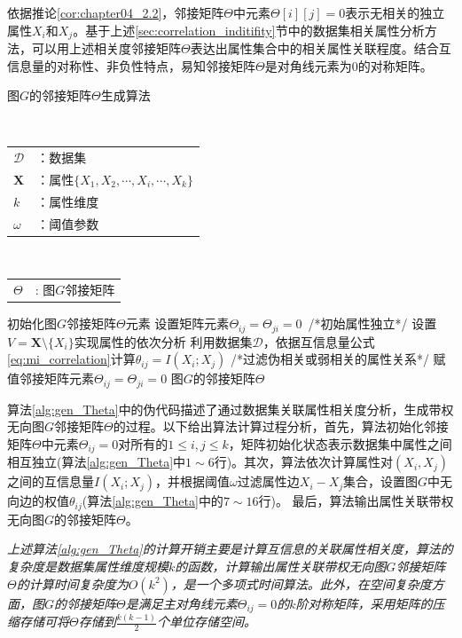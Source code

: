 依据推论\ref{cor:chapter04_2.2}，邻接矩阵$\Theta$中元素$\Theta[i][j]=0$表示无相关的独立属性$X_i$和$X_j$。基于上述\ref{sec:correlation_inditifity}节中的数据集相关属性分析方法，可以用上述相关度邻接矩阵$\Theta$表达出属性集合中的相关属性关联程度。结合互信息量的对称性、非负性特点\cite{shannon1948a}，易知邻接矩阵$\Theta$是对角线元素为$0$的对称矩阵。


\begin{algorithm}[htb]
 \small
\caption{ 图$G$的邻接矩阵$\Theta$生成算法}
\label{alg:gen_Theta}
\begin{algorithmic}[1]
\REQUIRE ~~\\
	\begin{tabular}[t]{p{1mm}l}
	 $\mathcal{D}$&：数据集\\
	 $\bm{X}$&：属性$\{X_1,X_2,\cdots,X_i,\cdots,X_k\}$\\
	 $k$&：属性维度\\
	 $\omega$&：阈值参数
	\end{tabular}
	\ENSURE ~~\\
	\begin{tabular}[t]{p{1mm}l}
	$\Theta$&: 图$G$邻接矩阵
	\end{tabular}
\STATE 初始化图$G$邻接矩阵$\Theta$元素
\STATE 设置矩阵元素$\Theta_{ij}=\Theta_{ji}=0$~/*初始属性独立*/
\ENDFOR
\ENDFOR
{}
\STATE 设置$V=\bm{X}\setminus\{X_i\}$实现属性的依次分析
\STATE 利用数据集$\mathcal{D}$，依据互信息量公式\ref{eq:mi_correlation}计算$\theta_{ij}=I(X_i;X_j)$
\STATE /*过滤伪相关或弱相关的属性关系*/
\STATE 赋值邻接矩阵元素$\Theta_{ij}=\Theta_{ji}=0$
\ENDIF
\ENDFOR
\ENDFOR
\RETURN 图$G$的邻接矩阵$\Theta$
\end{algorithmic}
\end{algorithm}


算法\ref{alg:gen_Theta}中的伪代码描述了通过数据集关联属性相关度分析，生成带权无向图$G$邻接矩阵$\Theta$的过程。以下给出算法计算过程分析，首先，算法初始化邻接矩阵$\Theta$中元素$\Theta_{ij}=0$对所有的$ 1\leq i,j \leq k$，矩阵初始化状态表示数据集中属性之间相互独立(算法\ref{alg:gen_Theta}中$1 \sim 6$行)。其次，算法依次计算属性对$(X_i,X_j)$之间的互信息量$I(X_i;X_j)$，并根据阈值$\omega$过滤属性边$X_i-X_j$集合，设置图$G$中无向边的权值$\theta_{ij}$(算法\ref{alg:gen_Theta}中的$7 \sim 16$行)。 最后，算法输出属性关联带权无向图$G$的邻接矩阵$\Theta$。

\begin{remark}
{\em 上述算法\textup{\ref{alg:gen_Theta}}的计算开销主要是计算互信息的关联属性相关度，算法的复杂度是数据集属性维度规模$k$的函数，计算输出属性关联带权无向图$G$邻接矩阵$\Theta$的计算时间复杂度为$O(k^2)$，是一个多项式时间算法。此外，在空间复杂度方面，图$G$的邻接矩阵$\Theta$是满足主对角线元素$\Theta_{ij}=0$的$k$阶对称矩阵，采用矩阵的压缩存储可将$\Theta$存储到$\frac{k(k-1)}{2}$个单位存储空间。}
\end{remark}
